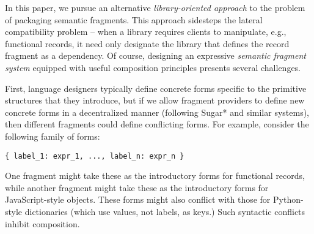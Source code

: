\documentclass[preprint,10pt]{sigplanconf}
\newcommand{\typy}{\texttt{typy}}
\begin{document}
In this paper, we pursue an alternative \emph{library-oriented approach} to the problem of packaging semantic fragments. %
This approach sidesteps the lateral compatibility problem -- when a library requires clients to manipulate, e.g., functional records, it need only designate the library that defines the record fragment as a dependency. 
Of course, designing an expressive \emph{semantic fragment system} equipped with useful composition principles presents several  challenges.



First, language designers typically define  concrete forms specific to the primitive structures that they introduce, but if we allow fragment providers to define new concrete forms in a decentralized manner (following Sugar* \cite{erdweg2013framework} and similar systems), then different fragments could define conflicting forms. For example, consider the following family of forms:
\begin{lstlisting}[numbers=none]
{ label_1: expr_1, ..., label_n: expr_n }
\end{lstlisting}
One fragment might take these as the introductory forms for functional records, while another fragment might take these as the introductory forms for JavaScript-style objects. These forms might also conflict with those for Python-style dictionaries (which use values, not labels, as keys.) Such syntactic conflicts inhibit composition.
\end{document}
